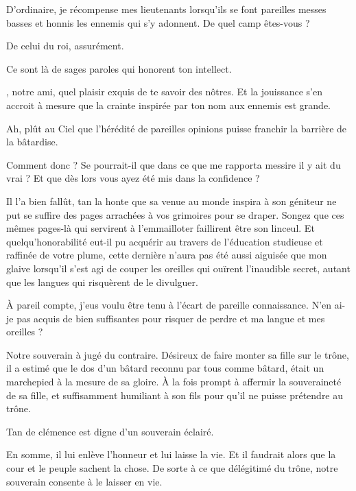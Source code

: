 \begin{drama}
  \generalspeaks D’ordinaire, je récompense mes lieutenants lorsqu’ils se font pareilles messes basses et honnis les ennemis qui s’y adonnent. De quel camp êtes-vous ? 

  \alexasspeaks De celui du roi, assurément.

  \generalspeaks Ce sont là de sages paroles qui honorent ton intellect.

  \elenaspeaks \general, notre ami, quel plaisir exquis de te savoir des nôtres. Et la jouissance s’en accroit à mesure que la crainte inspirée par ton nom aux ennemis est grande.

  \generalspeaks Ah, plût au Ciel que l’hérédité de pareilles opinions puisse franchir la barrière de la bâtardise.

  \alexasspeaks Comment donc \general ? Se pourrait-il que dans ce que me rapporta messire \elena il y ait du vrai ? Et que dès lors vous ayez été mis dans la confidence ? 

  \generalspeaks
  Il l’a bien fallût, tan la honte que sa venue au monde inspira à son géniteur ne put se suffire des pages arrachées à vos grimoires pour se draper. Songez que ces mêmes pages-là qui servirent à l’emmailloter faillirent être son linceul.
  Et quelqu’honorabilité eut-il pu acquérir au travers de l’éducation studieuse et raffinée de votre plume, cette dernière n’aura pas été aussi aiguisée que mon glaive lorsqu’il s’est agi de couper les oreilles qui ouïrent l’inaudible secret, autant que les langues qui risquèrent de le divulguer.

  \alexasspeaks À pareil compte, j’eus voulu être tenu à l’écart de pareille connaissance. N’en ai-je pas acquis de bien suffisantes pour risquer de perdre et ma langue et mes oreilles ?

  \generalspeaks Notre souverain à jugé du contraire. Désireux de faire monter sa fille sur le trône, il a estimé que le dos d’un bâtard reconnu par tous comme bâtard, était un marchepied à la mesure de sa gloire. À la fois prompt à affermir la souveraineté de sa fille, et suffisamment humiliant à son fils pour qu’il ne puisse prétendre au trône.

  \elenaspeaks Tan de clémence est digne d’un souverain éclairé.

  \alexasspeaks En somme, il lui enlève l’honneur et lui laisse la vie. Et il faudrait alors que la cour et le peuple sachent la chose. De sorte à ce que délégitimé du trône, notre souverain consente à le laisser en vie.


\end{drama}
